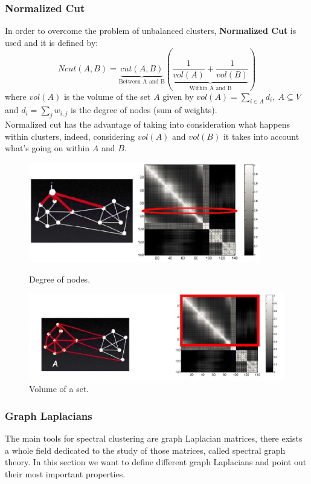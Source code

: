 \subsubsection{Normalized Cut}
In order to overcome the problem of unbalanced clusters, \textbf{Normalized Cut} is used and it is defined by:
$$Ncut(A,B) = \underbrace{cut(A,B)}_{\text{Between A and B}}\left( \underbrace{\frac{1}{vol(A)} + \frac{1}{vol(B)}}_{\text{Within A and B}}\right)$$
where $vol(A)$ is the volume of the set $A$ given by $vol(A) = \sum_{i \in A}d_i,~A \subseteq V$ and $d_i = \sum_j w_{i,j}$ is the degree of nodes (sum of weights).\\
Normalized cut has the advantage of taking into consideration what happens within clusters, indeed, considering $vol(A)$ and $vol(B)$ it takes into account what's going on within $A$ and $B$.
\begin{figure}[H]
	\begin{minipage}[t]{0.46\linewidth} 
		\centering
		\includegraphics[width=0.9\textwidth]{img/degreeNodes}
		\caption{Degree of nodes.}
	\end{minipage}        
	\hspace{1cm}
	\begin{minipage}[t]{0.49\linewidth} 
		\centering
		\includegraphics[width=1\textwidth]{img/volumeSet}
		\caption{Volume of a set.}
	\end{minipage}
\end{figure}

\subsubsection{Graph Laplacians}
The main tools for spectral clustering are graph Laplacian matrices, there exists a whole field dedicated to the study of those matrices, called spectral graph theory.  In this section we want to define different graph Laplacians and point out their most important properties.

